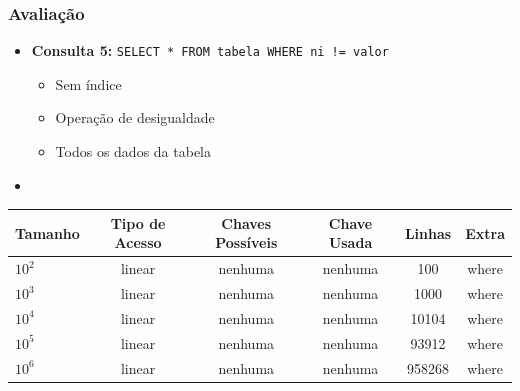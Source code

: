\documentclass[10pt]{beamer}
\begin{document}
\begin{frame}[fragile]
  \frametitle{Avaliação}

    \begin{itemize}
      \item \textbf{Consulta 5: } \texttt{SELECT * FROM tabela WHERE ni != valor}
      \begin{itemize}
        \item[-] Sem índice
        \item[-] Operação de desigualdade
        \item[-] Todos os dados da tabela
      \end{itemize}

      \item[\ ] \ 

    \end{itemize}

     \begin{table}[!htb]
    \footnotesize
    \centering
    \begin{tabular}{lccccc}
      \toprule
      \textbf{Tamanho} & \textbf{Tipo de Acesso}  & \textbf{Chaves Possíveis}  & \textbf{Chave Usada} & \textbf{Linhas} & \textbf{Extra}  \\
      \midrule
      $10^2$  & linear  &  nenhuma  & nenhuma  & 100     & where  \\
      $10^3$  & linear  &  nenhuma  & nenhuma  & 1000    & where  \\
      $10^4$  & linear  &  nenhuma  & nenhuma  & 10104   & where  \\
      $10^5$  & linear  &  nenhuma  & nenhuma  & 93912   & where  \\
      $10^6$  & linear  &  nenhuma  & nenhuma  & 958268  & where  \\

      \bottomrule
    \end{tabular}
    \end{table}

\end{frame}
\end{document}

